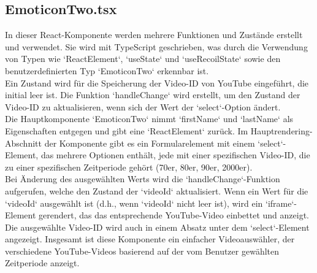 \documentclass[./dokumentation.tex]{subfiles}
\begin{document}
\subsection{EmoticonTwo.tsx}
In dieser React-Komponente werden mehrere Funktionen und Zustände erstellt und verwendet. Sie wird mit TypeScript geschrieben, was durch die Verwendung von Typen wie `ReactElement`, `useState` und `useRecoilState` sowie den benutzerdefinierten Typ `EmoticonTwo` erkennbar ist. \\
Ein Zustand wird für die Speicherung der Video-ID von YouTube eingeführt, die initial leer ist. Die Funktion `handleChange` wird erstellt, um den Zustand der Video-ID zu aktualisieren, wenn sich der Wert der `select`-Option ändert.\\
Die Hauptkomponente `EmoticonTwo` nimmt `firstName` und `lastName` als Eigenschaften entgegen und gibt eine `ReactElement` zurück. Im Hauptrendering-Abschnitt der Komponente gibt es ein Formularelement mit einem `select`-Element, das mehrere Optionen enthält, jede mit einer spezifischen Video-ID, die zu einer spezifischen Zeitperiode gehört (70er, 80er, 90er, 2000er). \\
Bei Änderung des ausgewählten Werts wird die `handleChange`-Funktion aufgerufen, welche den Zustand der `videoId` aktualisiert. Wenn ein Wert für die `videoId` ausgewählt ist (d.h., wenn `videoId` nicht leer ist), wird ein `iframe`-Element gerendert, das das entsprechende YouTube-Video einbettet und anzeigt. \\
Die ausgewählte Video-ID wird auch in einem Absatz unter dem `select`-Element angezeigt. Insgesamt ist diese Komponente ein einfacher Videoauswähler, der verschiedene YouTube-Videos basierend auf der vom Benutzer gewählten Zeitperiode anzeigt.
\end{document}

